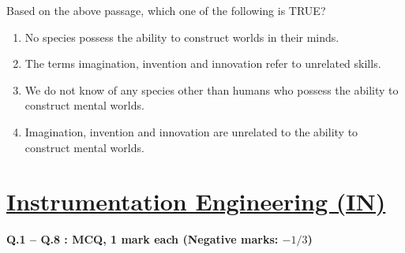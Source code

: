 \documentclass[journal,12pt,onecolumn]{IEEEtran}
\theoremstyle{remark}
\begin{document}
\begin{enumerate}
Based on the above passage, which one of the following is TRUE?
\par \hfill{}
\begin{enumerate}
  \item No species possess the ability to construct worlds in their minds.
  \item The terms imagination, invention and innovation refer to unrelated skills.
  \item We do not know of any species other than humans who possess the ability to construct mental worlds.
  \item Imagination, invention and innovation are unrelated to the ability to construct mental worlds.
\end{enumerate}

\end{enumerate}

\section*{\textbf{\underline{Instrumentation Engineering (IN)}}}

\textbf{Q.1 -- Q.8 : MCQ, 1 mark each (Negative marks: $-1/3$)}
\end{document}
